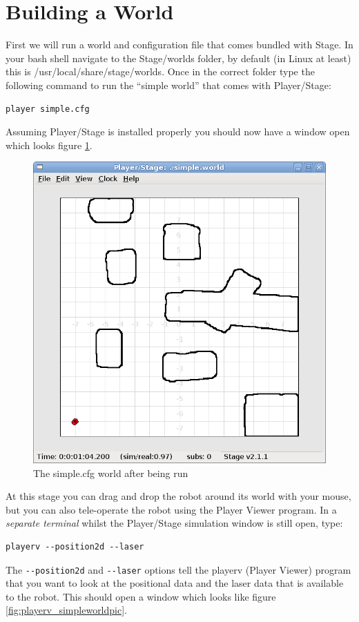\documentclass[a4paper]{report}
\newcommand{\plst}{Player/Stage\xspace}
\newcommand{\pl}{Player\xspace}
\begin{document}
\section{Building a World} \label{sec:BuildingAWorld}

First we will run a world and configuration file that comes bundled with Stage. In your bash shell navigate to the Stage/worlds folder, by default (in Linux at least) this is /usr/local/share/stage/worlds. Once in the correct folder type the following command to run the ``simple world'' that comes with \plst:
\begin{verbatim}
player simple.cfg
\end{verbatim}
Assuming \plst is installed properly you should now have a window open which looks figure \ref{fig:simpleworldpic}.
\begin{figure}
	\centering
	\includegraphics[width=0.8\linewidth]{./pics/simpleworld.png}
	\caption{The simple.cfg world after being run}
	\label{fig:simpleworldpic}
\end{figure}
At this stage you can drag and drop the robot around its world with your mouse, but you can also tele-operate the robot using the \pl Viewer program. In a \emph{separate terminal} whilst the \plst simulation window is still open, type:
\begin{verbatim}
playerv --position2d --laser
\end{verbatim}
The \verb|--position2d| and \verb|--laser| options tell the playerv (\pl Viewer) program that you want to look at the positional data and the laser data that is available to the robot. This should open a window which looks like figure \ref{fig:playerv_simpleworldpic}. 
\end{document}
